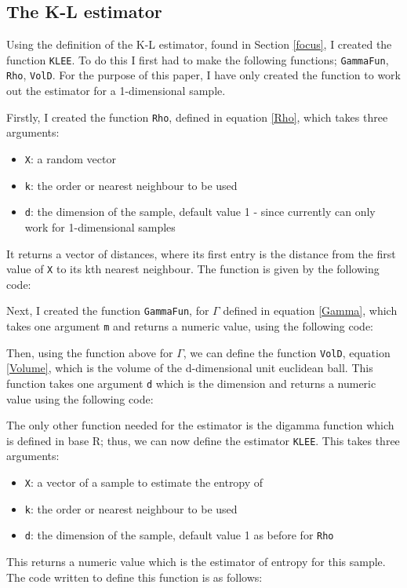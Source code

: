 \documentclass[12pt]{report}
\begin{document}
\begin{appendix}
\section{The K-L estimator}

Using the definition of the K-L estimator, found in Section \ref{focus}, I created the function \texttt{KLEE}. To do this I first had to make the following functions; \texttt{GammaFun}, \texttt{Rho}, \texttt{VolD}. For the purpose of this paper, I have only created the function to work out the estimator for a 1-dimensional sample.

Firstly, I created the function \texttt{Rho}, defined in equation \ref{Rho}, which takes three arguments:
\begin{itemize}
\item \texttt{X}: a random vector
\item \texttt{k}: the order or nearest neighbour to be used
\item \texttt{d}: the dimension of the sample, default value 1 - since currently can only work for 1-dimensional samples
\end{itemize}

It returns a vector of distances, where its first entry is the distance from the first value of \texttt{X} to its kth nearest neighbour. The function is given by the following code:


Next, I created the function \texttt{GammaFun}, for $\Gamma$ defined in equation \ref{Gamma}, which takes one argument \texttt{m} and returns a numeric value, using the following code:


Then, using the function above for $\Gamma$, we can define the function \texttt{VolD}, equation \ref{Volume}, which is the volume of the d-dimensional unit euclidean ball. This function takes one argument \texttt{d} which is the dimension and returns a numeric value using the following code:


The only other function needed for the estimator is the digamma function which is defined in base R; thus, we can now define the estimator \texttt{KLEE}. This takes three arguments:
\begin{itemize}
\item \texttt{X}: a vector of a sample to estimate the entropy of
\item \texttt{k}: the order or nearest neighbour to be used
\item \texttt{d}: the dimension of the sample, default value 1 as before for \texttt{Rho}
\end{itemize}
This returns a numeric value which is the estimator of entropy for this sample. The code written to define this function is as follows:





\end{appendix}
\end{document}
